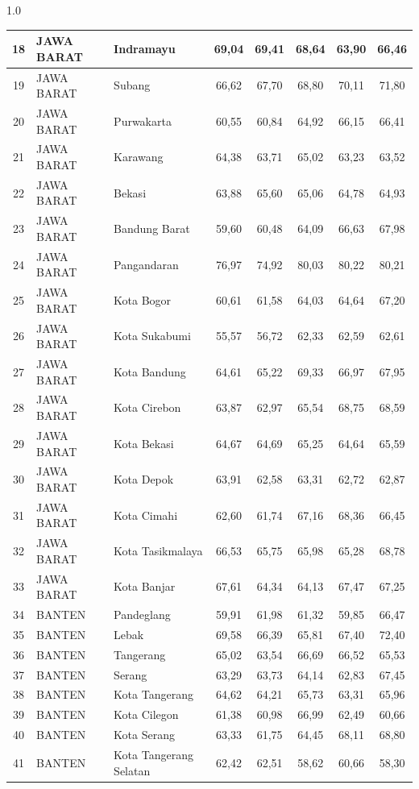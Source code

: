 \begin{spacing}{1.0}
\begin{longtable}{|c|p{2.2cm}|p{2.8cm}|c|c|c|c|c|}
18 & JAWA BARAT & Indramayu & 69,04 & 69,41 & 68,64 & 63,90 & 66,46 \\ \hline
19 & JAWA BARAT & Subang & 66,62 & 67,70 & 68,80 & 70,11 & 71,80 \\ \hline
20 & JAWA BARAT & Purwakarta & 60,55 & 60,84 & 64,92 & 66,15 & 66,41 \\ \hline
21 & JAWA BARAT & Karawang & 64,38 & 63,71 & 65,02 & 63,23 & 63,52 \\ \hline
22 & JAWA BARAT & Bekasi & 63,88 & 65,60 & 65,06 & 64,78 & 64,93 \\ \hline
23 & JAWA BARAT & Bandung Barat & 59,60 & 60,48 & 64,09 & 66,63 & 67,98 \\ \hline
24 & JAWA BARAT & Pangandaran & 76,97 & 74,92 & 80,03 & 80,22 & 80,21 \\ \hline
25 & JAWA BARAT & Kota Bogor & 60,61 & 61,58 & 64,03 & 64,64 & 67,20 \\ \hline
26 & JAWA BARAT & Kota Sukabumi & 55,57 & 56,72 & 62,33 & 62,59 & 62,61 \\ \hline
27 & JAWA BARAT & Kota Bandung & 64,61 & 65,22 & 69,33 & 66,97 & 67,95 \\ \hline
28 & JAWA BARAT & Kota Cirebon & 63,87 & 62,97 & 65,54 & 68,75 & 68,59 \\ \hline
29 & JAWA BARAT & Kota Bekasi & 64,67 & 64,69 & 65,25 & 64,64 & 65,59 \\ \hline
30 & JAWA BARAT & Kota Depok & 63,91 & 62,58 & 63,31 & 62,72 & 62,87 \\ \hline
31 & JAWA BARAT & Kota Cimahi & 62,60 & 61,74 & 67,16 & 68,36 & 66,45 \\ \hline
32 & JAWA BARAT & Kota Tasikmalaya & 66,53 & 65,75 & 65,98 & 65,28 & 68,78 \\ \hline
33 & JAWA BARAT & Kota Banjar & 67,61 & 64,34 & 64,13 & 67,47 & 67,25 \\ \hline
34 & BANTEN & Pandeglang & 59,91 & 61,98 & 61,32 & 59,85 & 66,47 \\ \hline
35 & BANTEN & Lebak & 69,58 & 66,39 & 65,81 & 67,40 & 72,40 \\ \hline
36 & BANTEN & Tangerang & 65,02 & 63,54 & 66,69 & 66,52 & 65,53 \\ \hline
37 & BANTEN & Serang & 63,29 & 63,73 & 64,14 & 62,83 & 67,45 \\ \hline
38 & BANTEN & Kota Tangerang & 64,62 & 64,21 & 65,73 & 63,31 & 65,96 \\ \hline
39 & BANTEN & Kota Cilegon & 61,38 & 60,98 & 66,99 & 62,49 & 60,66 \\ \hline
40 & BANTEN & Kota Serang & 63,33 & 61,75 & 64,45 & 68,11 & 68,80 \\ \hline
41 & BANTEN & Kota Tangerang Selatan & 62,42 & 62,51 & 58,62 & 60,66 & 58,30 \\ \hline
\end{longtable}
\end{spacing}
\newpage

